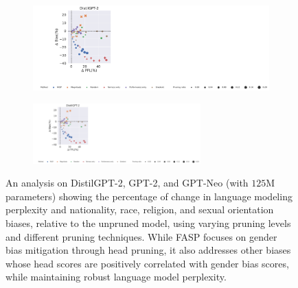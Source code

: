 \documentclass[letterpaper]{article} %
\newcommand{\goncalo}[1]
{\textcolor{orange}{{\bf}{\em #1}{\bf}}}
\begin{document}
\begin{figure}[!h]
      \begin{subfigure}
    \centering    \includegraphics[clip, trim=0cm 0.295cm 19cm 14.8cm, width=1.0\textwidth]{figures/camera_Ready_gender_bias_red_DistilGPT-2_gender_and_sex_legend.pdf}
     \end{subfigure}
    \begin{subfigure}
    \centering    \includegraphics[clip, trim=24.8cm 0.29cm 0.15cm 14.75cm, width=0.71\textwidth]{figures/camera_Ready_gender_bias_red_DistilGPT-2_gender_and_sex_legend.pdf}
     \end{subfigure}
   \caption{An analysis on DistilGPT-2, GPT-2, and GPT-Neo (with $125$M parameters) showing the percentage of change in language modeling perplexity and nationality, race, religion, and sexual orientation biases, relative to the unpruned model, using varying pruning levels and different pruning techniques. While FASP focuses on gender bias mitigation through head pruning, it also addresses other biases whose head scores are positively correlated with gender bias scores, while maintaining robust language model perplexity. 
        }
        \label{fig:effect_on_ther_biases_gpt2}
\end{figure}

\end{document}
